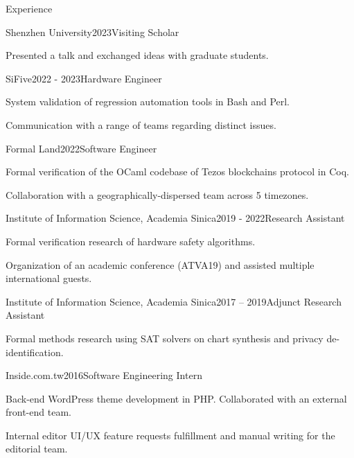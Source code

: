 \documentclass{resume} %
\begin{document}
\begin{rSection}{Experience}

\begin{rSubsection}{Shenzhen University}{2023}{Visiting Scholar}{}
\item Presented a talk and exchanged ideas with graduate students.
\end{rSubsection}

\begin{rSubsection}{SiFive}{2022 - 2023}{Hardware Engineer}{}
\item System validation of regression automation tools in Bash and Perl.
\item Communication with a range of teams regarding distinct issues.
\end{rSubsection}

\begin{rSubsection}{Formal Land}{2022}{Software Engineer}{}
\item Formal verification of the OCaml codebase of Tezos blockchains protocol in Coq.
\item Collaboration with a geographically-dispersed team across 5 timezones.
\end{rSubsection}

\begin{rSubsection}{Institute of Information Science, Academia Sinica}{2019 - 2022}{Research Assistant}{}
\item Formal verification research of hardware safety algorithms.
\item Organization of an academic conference (ATVA19) and assisted multiple international guests.
\end{rSubsection}


\begin{rSubsection}{Institute of Information Science, Academia Sinica}{2017 – 2019}{Adjunct Research Assistant}{}
\item Formal methods research using SAT solvers on chart synthesis and privacy de-identification.
\end{rSubsection}


\begin{rSubsection}{Inside.com.tw}{2016}{Software Engineering Intern}{}
\item Back-end WordPress theme development in PHP. Collaborated with an external front-end team.
\item Internal editor UI/UX feature requests fulfillment and manual writing for the editorial team.
\end{rSubsection}


\end{rSection}
\end{document}
